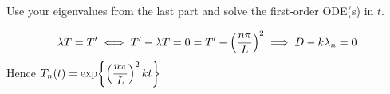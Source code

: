 Use your eigenvalues from the last part and solve the first-order ODE(s) in $t$.

\soln*
$$\lambda T = T' \iff T' - \lambda T = 0 = T' - \pfrac{\np}{L}^2 \implies D - k\lambda_n = 0$$
Hence $\displaystyle T_n(t) = \exp{\pfrac{\np}{L}^2 kt }$